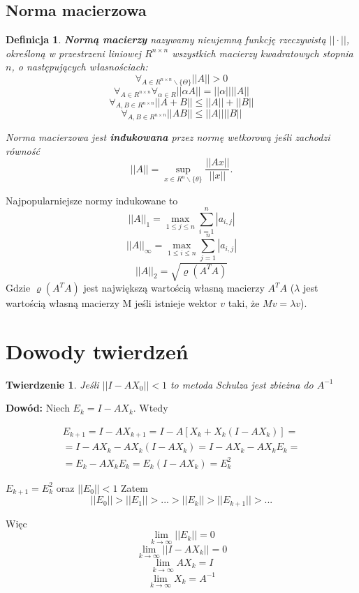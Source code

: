 \documentclass[11pt,a4paper]{article}
\newtheorem{defn}{Definicja}
\newtheorem{twr}{Twierdzenie}
\begin{document}
    \subsection{Norma macierzowa}
    \begin{defn}
        \textbf{Normą macierzy} nazywamy nieujemną funkcję rzeczywistą $||\cdot||$, określoną w przestrzeni liniowej $R^{n \times n}$ wszystkich macierzy kwadratowych stopnia $n$, o następujących własnościach:
        $$\forall_{A \in R^{n \times n}\backslash \{\Theta\}} ||A|| > 0$$
        $$\forall_{A \in R^{n \times n}} \forall_{\alpha \in R} ||\alpha A|| = ||\alpha|| ||A||$$
        $$\forall_{A,B \in R^{n \times n}} ||A+B|| \leq ||A|| + ||B||$$
        $$\forall_{A,B \in R^{n \times n}} ||AB|| \leq ||A||||B||$$
    

        Norma macierzowa jest \textbf{indukowana} przez normę wetkorową jeśli zachodzi równość
        $$ ||A|| = \sup_{x \in R^n \backslash \{\theta\}} \frac{||Ax||}{||x||}.$$
    \end{defn}
    Najpopularniejsze normy indukowane to
    $$||A||_1 = \max_{1 \leq j \leq n} \sum_{i=1}^n |a_{i,j}|$$
    $$||A||_\infty = \max_{1 \leq i \leq n} \sum_{j=1}^n |a_{i,j}|$$
    $$||A||_2 = \sqrt{\varrho(A^TA)}$$
    Gdzie $\varrho(A^TA)$ jest największą wartością własną macierzy $A^TA$ ($\lambda$ jest wartością własną macierzy M jeśli istnieje wektor $v$ taki, że $Mv=\lambda v$).

    \section{Dowody twierdzeń}
    \begin{twr}
        Jeśli $||I-AX_0|| < 1$ to metoda Schulza jest zbieżna do $A^{-1}$
    \end{twr}
    \textbf{Dowód:}
        Niech $E_k = I - AX_k$. Wtedy
    
    \begin{multline*}
        E_{k+1} = I - AX_{k+1} = I - A[X_k + X_k(I-AX_k)] =\\= I - AX_k - AX_k(I-AX_k) = I - AX_k - AX_kE_k =\\= E_k - AX_kE_k = E_k(I-AX_k) = E_k^2 
    \end{multline*}
    
    $E_{k+1} = E_k^2$ oraz $||E_0|| < 1$ Zatem
    $$
        ||E_0|| > ||E_1|| > ... > ||E_k|| > ||E_{k+1}|| > ...
    $$

    Więc
    $$
        \lim_{k \to \infty}||E_k|| = 0
    $$
    $$
        \lim_{k \to \infty}||I - AX_k|| = 0
    $$
    $$
        \lim_{k \to \infty}AX_k = I
    $$
    $$
        \lim_{k \to \infty}X_k = A^{-1}
    $$
\end{document}
